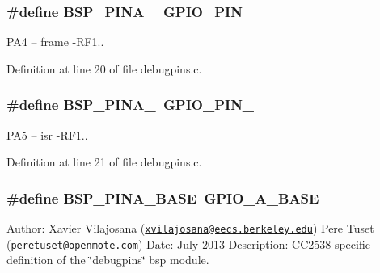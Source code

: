 \subsubsection[{\texorpdfstring{B\+S\+P\+\_\+\+P\+I\+N\+A\+\_\+4}{BSP_PINA_4}}]{\setlength{\rightskip}{0pt plus 5cm}\#define B\+S\+P\+\_\+\+P\+I\+N\+A\+\_~{\bf G\+P\+I\+O\+\_\+\+P\+I\+N\+\_}}\hypertarget{_open_mote-_c_c2538_2debugpins_8c_acfb7b70741d0a6265f538b868b390a6c}{}\label{_open_mote-_c_c2538_2debugpins_8c_acfb7b70741d0a6265f538b868b390a6c}


P\+A4 -- frame -\/\+R\+F1.. 



Definition at line 20 of file debugpins.\+c.

\subsubsection[{\texorpdfstring{B\+S\+P\+\_\+\+P\+I\+N\+A\+\_\+5}{BSP_PINA_5}}]{\setlength{\rightskip}{0pt plus 5cm}\#define B\+S\+P\+\_\+\+P\+I\+N\+A\+\_~{\bf G\+P\+I\+O\+\_\+\+P\+I\+N\+\_}}\hypertarget{_open_mote-_c_c2538_2debugpins_8c_a18ac2f5dfce225343af3b486a4ba1fdf}{}\label{_open_mote-_c_c2538_2debugpins_8c_a18ac2f5dfce225343af3b486a4ba1fdf}


P\+A5 -- isr -\/\+R\+F1.. 



Definition at line 21 of file debugpins.\+c.

\subsubsection[{\texorpdfstring{B\+S\+P\+\_\+\+P\+I\+N\+A\+\_\+\+B\+A\+SE}{BSP_PINA_BASE}}]{\setlength{\rightskip}{0pt plus 5cm}\#define B\+S\+P\+\_\+\+P\+I\+N\+A\+\_\+\+B\+A\+SE~{\bf G\+P\+I\+O\+\_\+\+A\+\_\+\+B\+A\+SE}}\hypertarget{_open_mote-_c_c2538_2debugpins_8c_aaa6c07737ad04ce6b4a82ddbdfdf3e3d}{}\label{_open_mote-_c_c2538_2debugpins_8c_aaa6c07737ad04ce6b4a82ddbdfdf3e3d}
Author\+: Xavier Vilajosana (\href{mailto:xvilajosana@eecs.berkeley.edu}{\tt xvilajosana@eecs.\+berkeley.\+edu}) Pere Tuset (\href{mailto:peretuset@openmote.com}{\tt peretuset@openmote.\+com}) Date\+: July 2013 Description\+: C\+C2538-\/specific definition of the \char`\"{}debugpins\char`\"{} bsp module. 

